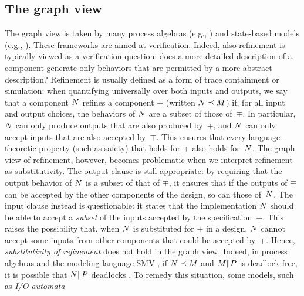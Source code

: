 \subsection{The graph view}

The graph view is taken by many process algebras 
(e.g., \cite{Hoare85,Milner89}) and state-based models 
(e.g., \cite{MPvol1,Lynch96,SMV96,RM96journal}).
These frameworks are aimed at verification.
Indeed, also refinement is typically viewed as a verification question:
does a more detailed description of a component generate only behaviors that 
are permitted by a more abstract description?
Refinement is usually defined as a form of trace containment or simulation: 
when quantifying universally over both inputs and outputs, we say that
a component $N$ refines a component $\mp$ (written $N \preceq M$)
if, for all input and output choices, the behaviors of $N$ are a
subset of those of~$\mp$.  
In particular, $N$ can only produce outputs that are also produced
by~$\mp$, and $N$ can only accept inputs that are also accepted 
by~$\mp$. 
This ensures that every
language-theoretic property (such as safety) that holds for $\mp$ also
holds for~$N$. %
%
The graph view of refinement, however, becomes problematic when we 
interpret refinement as substitutivity.
The output clause is still appropriate: by requiring that the output
behavior of $N$ is a subset of that of $\mp$, it ensures that if the 
outputs of $\mp$ can be accepted by the other components of the design, 
so can those of~$N$. 
The input clause instead is questionable: it states that the implementation
$N$ should be able to accept a {\em subset\/} of the inputs accepted
by the specification~$\mp$.
This raises the possibility that, when $N$ is substituted for $\mp$
in a design, $N$ cannot accept some inputs from other components
that could be accepted by~$\mp$. 
Hence, {\em substitutivity of refinement\/} does not hold in the
graph view.
Indeed, in process algebras and the modeling language SMV
\cite{SMV96}, if $N \preceq M$ and $M \| P$ is 
deadlock-free, it is possible that $N \| P$ deadlocks
\cite{AbramskyTACAS97}. 
To remedy this situation, some models, such as {\em I/O automata\/}
